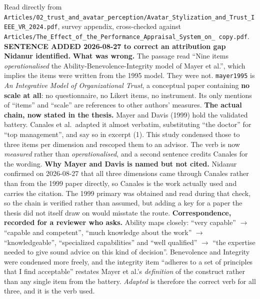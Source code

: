 \documentclass[11pt, a4paper]{article}
\begin{document}
\begin{Form}
  {Read directly from \texttt{\footnotesize Articles/02\_trust\_and\_avatar\_perception/Avatar\_Stylization\_and\_Trust\_IEEE\_VR\_2024.pdf}, survey appendix, cross-checked against \texttt{\footnotesize Articles/The\_Effect\_of\_the\_Performance\_Appraisal\_System\_on\_ copy.pdf}. \textbf{SENTENCE ADDED 2026-08-27 to correct an attribution gap Nidanur identified.} \textbf{What was wrong.} The passage read ``Nine items \emph{operationalised} the Ability-Benevolence-Integrity model of Mayer et al.'', which implies the items were written from the 1995 model. They were not. \texttt{mayer1995} is \emph{An Integrative Model of Organizational Trust}, a conceptual paper containing \textbf{no scale at all}: no questionnaire, no Likert items, no instrument. Its only mentions of ``items'' and ``scale'' are references to other authors' measures. \textbf{The actual chain, now stated in the thesis.} Mayer and Davis (1999) hold the validated battery. Canales et al.\ adapted it almost verbatim, substituting ``the doctor'' for ``top management'', and say so in excerpt (1). This study condensed those to three items per dimension and rescoped them to an advisor. The verb is now \emph{measured} rather than \emph{operationalised}, and a second sentence credits Canales for the wording. \textbf{Why Mayer and Davis is named but not cited.} Nidanur confirmed on 2026-08-27 that all three dimensions came through Canales rather than from the 1999 paper directly, so Canales is the work actually used and carries the citation. The 1999 primary was obtained and read during that check, so the chain is verified rather than assumed, but adding a key for a paper the thesis did not itself draw on would misstate the route. \textbf{Correspondence, recorded for a reviewer who asks.} Ability maps closely: ``very capable'' $\to$ ``capable and competent'', ``much knowledge about the work'' $\to$ ``knowledgeable'', ``specialized capabilities'' and ``well qualified'' $\to$ ``the expertise needed to give sound advice on this kind of decision''. Benevolence and Integrity were condensed more freely, and the integrity item ``adheres to a set of principles that I find acceptable'' restates Mayer et al.'s \emph{definition} of the construct rather than any single item from the battery. \emph{Adapted} is therefore the correct verb for all three, and it is the verb used.}


\end{Form}
\end{document}

